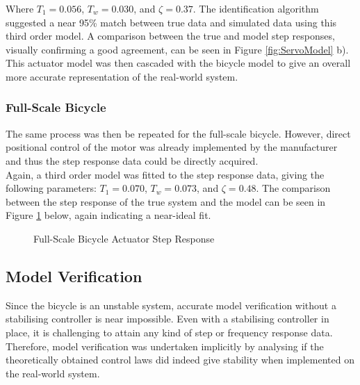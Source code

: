Where $T_1 = 0.056$, $T_w = 0.030$, and $\zeta = 0.37$. The identification algorithm suggested a near 95\% match between true data and simulated data using this third order model. A comparison between the true and model step responses, visually confirming a good agreement, can be seen in Figure \ref{fig:ServoModel} b). \\

This actuator model was then cascaded with the bicycle model to give an overall more accurate representation of the real-world system.

\subsubsection{Full-Scale Bicycle}
The same process was then be repeated for the full-scale bicycle. However, direct positional control of the motor was already implemented by the manufacturer and thus the step response data could be directly acquired. \\

Again, a third order model was fitted to the step response data, giving the following parameters: $T_1 = 0.070$, $T_w = 0.073$, and $\zeta = 0.48$. The comparison between the step response of the true system and the model can be seen in Figure \ref{fig:FSServoModel} below, again indicating a near-ideal fit. 

\begin{figure}[H]
	\centering
	\caption{Full-Scale Bicycle Actuator Step Response}
	\label{fig:FSServoModel}
\end{figure}

\subsection{Model Verification}
Since the bicycle is an unstable system, accurate model verification without a stabilising controller is near impossible. Even with a stabilising controller in place, it is challenging to attain any kind of step or frequency response data. Therefore, model verification was undertaken implicitly by analysing if the theoretically obtained control laws did indeed give stability when implemented on the real-world system.